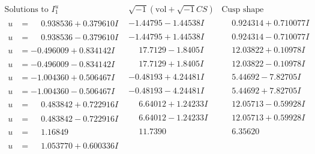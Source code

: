 \documentclass[1p]{elsarticle_modified}
\theoremstyle{definition}
\newcommand{\I}{\sqrt{-1}}
\begin{document}
$$\begin{array}{c|c|c}  
\text{Solutions to }I^u_{1}& \I (\text{vol} + \sqrt{-1}CS) & \text{Cusp shape}\\
 \hline 
\begin{aligned}
u &= \phantom{-}0.938536 + 0.379610 I\end{aligned}
 & -1.44795 - 1.44538 I & \phantom{-}0.924314 + 0.710077 I \\ \hline\begin{aligned}
u &= \phantom{-}0.938536 - 0.379610 I\end{aligned}
 & -1.44795 + 1.44538 I & \phantom{-}0.924314 - 0.710077 I \\ \hline\begin{aligned}
u &= -0.496009 + 0.834142 I\end{aligned}
 & \phantom{-}17.7129 - 1.8405 I & \phantom{-}12.03822 + 0.10978 I \\ \hline\begin{aligned}
u &= -0.496009 - 0.834142 I\end{aligned}
 & \phantom{-}17.7129 + 1.8405 I & \phantom{-}12.03822 - 0.10978 I \\ \hline\begin{aligned}
u &= -1.004360 + 0.506467 I\end{aligned}
 & -0.48193 + 4.24481 I & \phantom{-}5.44692 - 7.82705 I \\ \hline\begin{aligned}
u &= -1.004360 - 0.506467 I\end{aligned}
 & -0.48193 - 4.24481 I & \phantom{-}5.44692 + 7.82705 I \\ \hline\begin{aligned}
u &= \phantom{-}0.483842 + 0.722916 I\end{aligned}
 & \phantom{-}6.64012 + 1.24233 I & \phantom{-}12.05713 - 0.59928 I \\ \hline\begin{aligned}
u &= \phantom{-}0.483842 - 0.722916 I\end{aligned}
 & \phantom{-}6.64012 - 1.24233 I & \phantom{-}12.05713 + 0.59928 I \\ \hline\begin{aligned}
u &= \phantom{-}1.16849\phantom{ +0.000000I}\end{aligned}
 & \phantom{-}11.7390\phantom{ +0.000000I} & \phantom{-}6.35620\phantom{ +0.000000I} \\ \hline\begin{aligned}
u &= \phantom{-}1.053770 + 0.600336 I\end{aligned}

\end{array}$$
\end{document}
